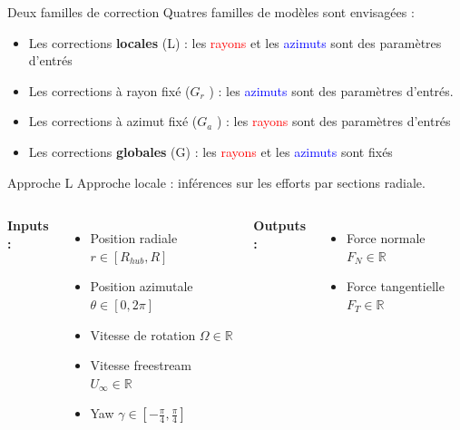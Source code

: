 \documentclass[
11pt,notheorems,hyperref={pdfauthor=whatever}
]{beamer}
\begin{document}
\begin{frame}{Deux familles de correction}
    Quatres familles de modèles sont envisagées :
    \begin{center}
    \begin{itemize}
    \item Les corrections \textbf{locales} (L) : les \textcolor{red}{rayons} et les \textcolor{blue}{azimuts} sont des paramètres d’entrés
    \item Les corrections à rayon fixé ($G_r$ ) : les \textcolor{blue}{azimuts}  sont des paramètres d’entrés.
    \item Les corrections à azimut fixé ($G_a$ ) : les \textcolor{red}{rayons} sont des paramètres d’entrés
    \item Les corrections \textbf{globales} (G) : les \textcolor{red}{rayons} et les \textcolor{blue}{azimuts}  sont fixés
    \end{itemize}
\end{center}
\end{frame}


\begin{frame}{Approche L}
    Approche locale : inférences sur les efforts par sections radiale. 

    \vspace{0.3cm}

    \begin{columns}[c]
        \textbf{Inputs :}
        \begin{itemize}\small
            \item Position radiale $r \in \left[R_{hub}, R\right]$
            \item Position azimutale $\theta \in \left[0,2\pi\right]$
            \item Vitesse de rotation $\Omega \in \mathbb{R}$
            \item Vitesse freestream $U_{\infty} \in \mathbb{R}$
            \item Yaw $\gamma \in \left[-\frac{\pi}{4}, \frac{\pi}{4}\right]$
        \end{itemize}

        \centering

        \textbf{Outputs :}
        \begin{itemize}\small
            \item Force normale $F_N \in \mathbb{R}$
            \item Force tangentielle $F_T \in \mathbb{R}$
        \end{itemize}
    \end{columns}
\end{frame}
\end{document}
